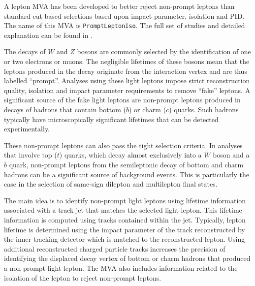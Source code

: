 
A lepton MVA has been developed to better reject non-prompt leptons than standard cut based selections based upon impact parameter, isolation and PID. The name of this MVA is \texttt{PromptLeptonIso}. The full set of studies and detailed explanation can be found in \cite{ttW_140}.

The decays of $W$ and $Z$ bosons are commonly selected by the identification of one or two electrons or muons.  The negligible lifetimes of these bosons mean that the leptons produced in the decay originate from the interaction vertex and are thus labelled ``prompt''.  Analyses using these light leptons impose strict reconstruction quality, isolation and impact parameter requirements to remove ``fake'' leptons. A significant source of the fake light leptons are non-prompt leptons produced in decays of hadrons that contain bottom ($b$) or charm ($c$) quarks. Such hadrons typically have microscopically significant lifetimes that can be detected experimentally.

These non-prompt leptons can also pass the tight selection criteria. In analyses that involve top ($t$) quarks, which decay almost exclusively into a $W$ boson and a $b$ quark, non-prompt leptons from the semileptonic decay of bottom and charm hadrons can be a significant source of background events. This is particularly the case in the selection of same-sign dilepton and multilepton final states. 

The main idea is to identify non-prompt light leptons using lifetime information associated with a track jet that matches the selected light lepton. This lifetime information is computed using tracks contained within the jet. Typically, lepton lifetime is determined using the impact parameter of the track reconstructed by the inner tracking detector which is matched to the reconstructed lepton. Using additional reconstructed charged particle tracks increases the precision of identifying the displaced decay vertex of bottom or charm hadrons that produced a non-prompt light lepton. The MVA also includes information related to the isolation of the lepton to reject non-prompt leptons.

